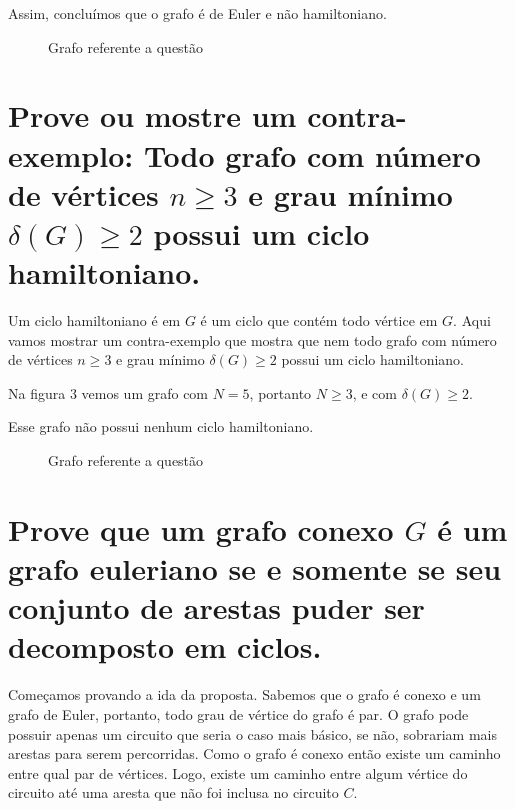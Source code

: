 \documentclass[a4paper,12pt]{article}
\begin{document}
	Assim, concluímos que o grafo é de Euler e não hamiltoniano.

	\begin{figure}[!ht]
		\centering
	\caption{Grafo referente a questão \thesection}
	\end{figure}

\section{Prove ou mostre um contra-exemplo: Todo grafo com número de vértices $n \geq 3$ e grau mínimo $\delta(G) \geq 2$ possui um ciclo hamiltoniano.}
	Um ciclo hamiltoniano é em $G$ é um ciclo que contém todo vértice em $G$. Aqui vamos mostrar um contra-exemplo que mostra que nem todo grafo com número de vértices $n \geq 3$ e grau mínimo $\delta(G) \geq 2$ possui um ciclo hamiltoniano.

	Na figura 3 vemos um grafo com $N = 5$, portanto $N \geq 3$, e com $\delta(G) \geq 2$.

	Esse grafo não possui nenhum ciclo hamiltoniano.


	\begin{figure}[!ht]
		\centering
		\caption{Grafo referente a questão \thesection}
	\end{figure}

\section{Prove que um grafo conexo $G$ é um grafo euleriano se e somente se seu conjunto de arestas puder ser decomposto em ciclos.}

	Começamos provando a ida da proposta. Sabemos que o grafo é conexo e um grafo de Euler, portanto, todo grau de vértice do grafo é par. O grafo pode possuir apenas um circuito que seria o caso mais básico, se não, sobrariam mais arestas para serem percorridas. Como o grafo é conexo então existe um caminho entre qual par de vértices. Logo, existe um caminho entre algum vértice do circuito até uma aresta que não foi inclusa no circuito $C$.
\end{document}
